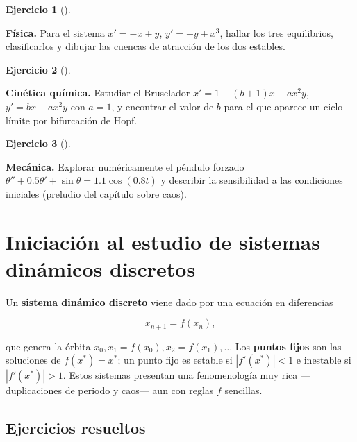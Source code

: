 \documentclass[
  spanish,
  a4paper,
]{scrreport}
\theoremstyle{definition}
\newtheorem{exercise}{Ejercicio}[chapter]
\theoremstyle{remark}
\begin{document}
\begin{exercise}[]\protect\hypertarget{exr-propuesto-lorenz-2d}{}\label{exr-propuesto-lorenz-2d}

\textbf{Física.} Para el sistema \(x' = -x + y\), \(y' = -y + x^3\),
hallar los tres equilibrios, clasificarlos y dibujar las cuencas de
atracción de los dos estables.

\end{exercise}

\begin{exercise}[]\protect\hypertarget{exr-propuesto-brusselator}{}\label{exr-propuesto-brusselator}

\textbf{Cinética química.} Estudiar el Bruselador
\(x' = 1 - (b+1)x + a x^2 y\), \(y' = bx - ax^2y\) con \(a = 1\), y
encontrar el valor de \(b\) para el que aparece un ciclo límite por
bifurcación de Hopf.

\end{exercise}

\begin{exercise}[]\protect\hypertarget{exr-propuesto-pendulo-forzado}{}\label{exr-propuesto-pendulo-forzado}

\textbf{Mecánica.} Explorar numéricamente el péndulo forzado
\(\theta'' + 0.5\theta' + \sin\theta = 1.1\cos(0.8t)\) y describir la
sensibilidad a las condiciones iniciales (preludio del capítulo sobre
caos).

\end{exercise}


\chapter{Iniciación al estudio de sistemas dinámicos
discretos}\label{iniciaciuxf3n-al-estudio-de-sistemas-dinuxe1micos-discretos}

Un \textbf{sistema dinámico discreto} viene dado por una ecuación en
diferencias

\[
x_{n+1} = f(x_n),
\]

que genera la órbita \(x_0, x_1 = f(x_0), x_2 = f(x_1),\dots\) Los
\textbf{puntos fijos} son las soluciones de \(f(x^*) = x^*\); un punto
fijo es estable si \(|f'(x^*)| < 1\) e inestable si \(|f'(x^*)| > 1\).
Estos sistemas presentan una fenomenología muy rica ---duplicaciones de
periodo y caos--- aun con reglas \(f\) sencillas.

\section{Ejercicios resueltos}\label{ejercicios-resueltos-5}
\end{document}
